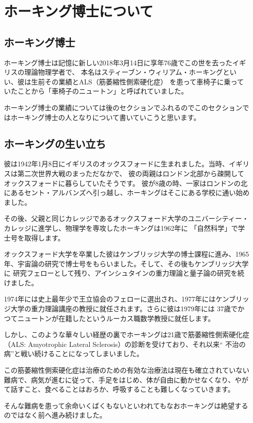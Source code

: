 \documentclass[10pt,b5paper,papersize,dvipdfmx]{jsbook}
\begin{document}
\section{ ホーキング博士について}

\subsection{ホーキング博士}
ホーキング博士は記憶に新しい2018年3月14日に享年76歳でこの世を去ったイギリスの理論物理学者で、
本名はスティーブン・ウィリアム・ホーキングといい、彼は生前その業績とALS（筋萎縮性側索硬化症）
を患って車椅子に乗っていたことから「車椅子のニュートン」と呼ばれていました。\par
ホーキング博士の業績については後のセクションでふれるのでこのセクションではホーキング博士の人となりについて書いていこうと思います。\par

\subsection{ホーキングの生い立ち}
彼は1942年1月8日にイギリスのオックスフォードに生まれました。当時、イギリスは第二次世界大戦のまっただなかで、
彼の両親はロンドン北部から疎開してオックスフォードに暮らしていたそうです。
彼が8歳の時、一家はロンドンの北にあるセント・アルバンズへ引っ越し、ホーキングはそこにある学校に通い始めました。\par
その後、父親と同じカレッジであるオックスフォード大学のユニバーシティー・カレッジに進学し、物理学を専攻したホーキングは1962年に
「自然科学」で学士号を取得します。\par
オックスフォード大学を卒業した彼はケンブリッジ大学の博士課程に進み、1965年、宇宙論の研究で博士号をもらいました。そして、その後もケンブリッジ大学に
研究フェローとして残り、アインシュタインの重力理論と量子論の研究を続けました。\par
1974年には史上最年少で王立協会のフェローに選出され、1977年にはケンブリッジ大学の重力理論講座の教授に就任されます。さらに彼は1979年には
37歳でかつてニュートンが在籍したというルーカス職数学教授に就任します。\par
しかし、このような華々しい経歴の裏でホーキングは21歳で筋萎縮性側索硬化症（ALS: Amyotrophic Lateral Sclerosis）の診断を受けており、それ以来“
不治の病”と戦い続けることになってしまいました。\par
この筋萎縮性側索硬化症は治療のための有効な治療法は現在も確立されていない難病で、病気が進むに従って、手足をはじめ、体が自由に動かせなくなり、やがて話すこと、食べることはおろか、呼吸することも難しくなっていきます。\par
そんな難病を患って余命いくばくもないといわれてもなおホーキングは絶望するのではなく前へ進み続けました。
\newpage
\end{document}
